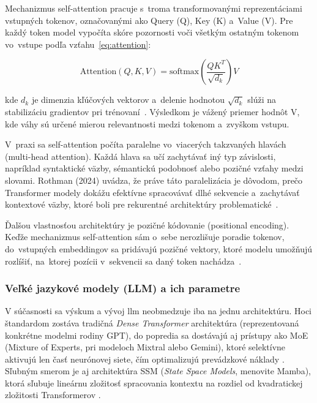 Mechanizmus self-attention pracuje s~troma transformovanými reprezentáciami
vstupných tokenov, označovanými ako Query (Q), Key (K) a~Value (V). Pre každý token
model vypočíta skóre pozornosti voči všetkým ostatným tokenom vo~vstupe podľa vzťahu~\eqref{eq:attention}:

\begin{equation}
	\text{Attention}(Q, K, V) = \text{softmax}\left(\frac{QK^{T}}{\sqrt{d_{k}}}\right
	) V \label{eq:attention}
\end{equation}

kde $d_{k}$ je dimenzia kľúčových vektorov a~delenie hodnotou $\sqrt{d_{k}}$ slúži
na stabilizáciu gradientov pri trénovaní~\cite{vaswani2017}. Výsledkom je vážený
priemer hodnôt V, kde váhy sú určené mierou relevantnosti medzi tokenom a~zvyškom
vstupu.

V~praxi sa self-attention počíta paralelne vo~viacerých takzvaných hlavách (multi-head
attention). Každá hlava sa učí zachytávať iný typ závislosti, napríklad syntaktické
väzby, sémantickú podobnosť alebo pozičné vzťahy medzi slovami. Rothman (2024) uvádza,
že práve táto paralelizácia je dôvodom, prečo Transformer modely dokážu efektívne
spracovávať dlhé sekvencie a~zachytávať kontextové väzby, ktoré boli pre
rekurentné architektúry problematické~\cite{rothman2024transformers}.

Ďalšou vlastnosťou architektúry je pozičné kódovanie (positional encoding). Keďže
mechanizmus self-attention sám o~sebe nerozlišuje poradie tokenov, do~vstupných
embeddingov sa pridávajú pozičné vektory, ktoré modelu umožňujú rozlíšiť, na~ktorej
pozícii v~sekvencii sa daný token nachádza~\cite{vaswani2017}.

\subsubsection{Veľké jazykové modely (LLM) a ich parametre}

V súčasnosti sa výskum a vývoj \gls{llm} neobmedzuje iba na jednu architektúru. Hoci
štandardom zostáva tradičná \textit{Dense Transformer} architektúra (reprezentovaná
konkrétne modelmi rodiny GPT), do popredia sa dostávajú aj prístupy ako MoE (Mixture
of Experts, pri modeloch Mixtral alebo Gemini), ktoré selektívne aktivujú len časť
neurónovej siete, čím optimalizujú prevádzkové náklady \cite{zhao2023}. Sľubným smerom
je aj architektúra SSM (\textit{State Space Models}, menovite Mamba), ktorá
sľubuje lineárnu zložitosť spracovania kontextu na rozdiel od kvadratickej
zložitosti Transformerov \cite{rothman2024transformers}.

